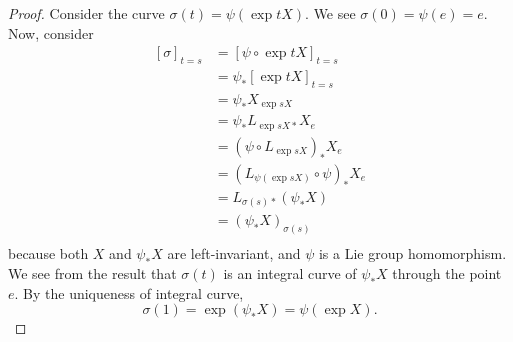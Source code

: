 \documentclass[../main.tex]{subfiles}
\begin{document}
\begin{proof}
    Consider the curve \(\sigma(t) = \psi(\exp tX)\). We see \(\sigma(0)
    = \psi(e) = e\). Now, consider
    \[
    \begin{aligned}
        [\sigma]_{t=s} &= [\psi\circ \exp tX]_{t=s} \\
                       &= \psi_* [\exp tX]_{t=s} \\
                       &= \psi_* X_{\exp sX} \\
                       &= \psi_* L_{\exp sX*} X_e \\
                       &= \left( \psi \circ L_{\exp sX} \right) _* X_e \\
                       &= \left( L_{\psi(\exp sX)}\circ \psi \right) _*
                       X_e \\
                       &= L_{\sigma(s)*} (\psi_*X)\\
                       &= (\psi_*X)_{\sigma(s)} \\
    \end{aligned}
    \]
    because both \(X\) and \(\psi_*X\) are left-invariant, and \(\psi\)
    is a Lie group homomorphism. We see from the result that
    \(\sigma(t)\) is an integral curve of \(\psi_*X\) through the point
    \(e\). By the uniqueness of integral curve, 
    \[
    \sigma(1) = \exp\left( \psi_*X \right) = \psi\left( \exp X \right).
    \]
\end{proof}
\end{document}
